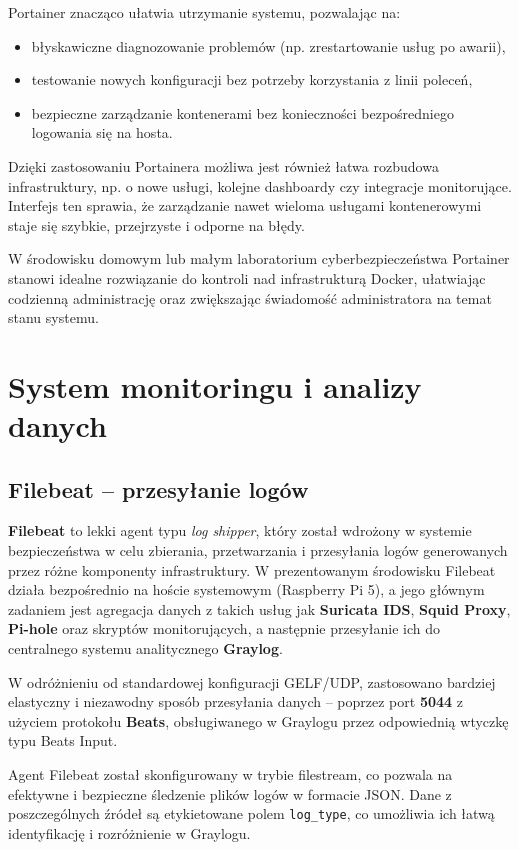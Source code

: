 \documentclass[
    left=2.5cm,         %
    right=2.5cm,        %
    top=2.5cm,          %
    bottom=3cm,         %
    bindingoffset=6mm,  %
    nohyphenation=true %
]{eiti/eiti-thesis} %
\begin{document}
Portainer znacząco ułatwia utrzymanie systemu, pozwalając na:
\begin{itemize}
    \item błyskawiczne diagnozowanie problemów (np. zrestartowanie usług po awarii),
    \item testowanie nowych konfiguracji bez potrzeby korzystania z linii poleceń,
    \item bezpieczne zarządzanie kontenerami bez konieczności bezpośredniego logowania się na hosta.
\end{itemize}

Dzięki zastosowaniu Portainera możliwa jest również łatwa rozbudowa infrastruktury, np. o nowe usługi, kolejne dashboardy czy integracje monitorujące. Interfejs ten sprawia, że zarządzanie nawet wieloma usługami kontenerowymi staje się szybkie, przejrzyste i odporne na błędy.

W środowisku domowym lub małym laboratorium cyberbezpieczeństwa Portainer stanowi idealne rozwiązanie do kontroli nad infrastrukturą Docker, ułatwiając codzienną administrację oraz zwiększając świadomość administratora na temat stanu systemu.


\newpage 
\section{System monitoringu i analizy danych}

\subsection{Filebeat – przesyłanie logów}

\textbf{Filebeat} to lekki agent typu \textit{log shipper}, który został wdrożony w systemie bezpieczeństwa w celu zbierania, przetwarzania i przesyłania logów generowanych przez różne komponenty infrastruktury. W prezentowanym środowisku Filebeat działa bezpośrednio na hoście systemowym (Raspberry Pi 5), a jego głównym zadaniem jest agregacja danych z takich usług jak \textbf{Suricata IDS}, \textbf{Squid Proxy}, \textbf{Pi-hole} oraz skryptów monitorujących, a następnie przesyłanie ich do centralnego systemu analitycznego \textbf{Graylog}.

W odróżnieniu od standardowej konfiguracji GELF/UDP, zastosowano bardziej elastyczny i niezawodny sposób przesyłania danych – poprzez port \textbf{5044} z użyciem protokołu \textbf{Beats}, obsługiwanego w Graylogu przez odpowiednią wtyczkę typu Beats Input.

Agent Filebeat został skonfigurowany w trybie filestream, co pozwala na efektywne i bezpieczne śledzenie plików logów w formacie JSON. Dane z poszczególnych źródeł są etykietowane polem \texttt{log\_type}, co umożliwia ich łatwą identyfikację i rozróżnienie w Graylogu.
\end{document}
